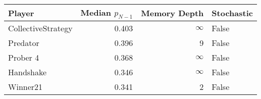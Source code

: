 \begin{tabular}{lrrl}
\toprule
             Player &  Median $p_{N-1}$ &  Memory Depth & Stochastic \\
\midrule
 CollectiveStrategy &             0.403 &            \(\infty\) &      False \\
           Predator &             0.396 &             9 &      False \\
           Prober 4 &             0.368 &            \(\infty\) &      False \\
          Handshake &             0.346 &            \(\infty\) &      False \\
           Winner21 &             0.341 &             2 &      False \\
\bottomrule
\end{tabular}
